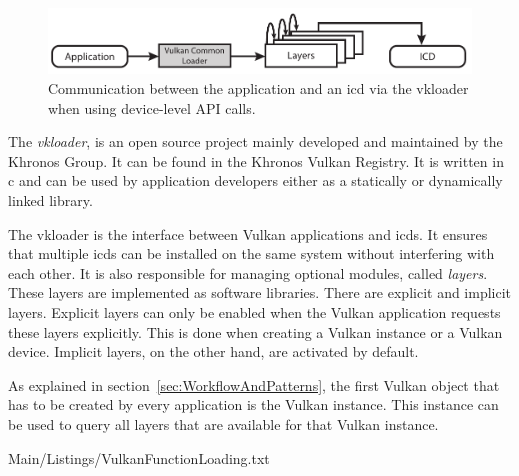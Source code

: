     \begin{figure}
      \includegraphics{Main/Images/VulkanLoaderDeviceLayers}
      \centering
      \caption{Communication between the application and an \gls{icd} via the \gls{vkloader} when using device-level API calls.}
      \label{fig:VulkanLoaderWithDeviceLayers}
    \end{figure}

    The \textit{\gls{vkloader}}, is an open source project mainly developed and maintained by the Khronos Group. It can be found in the Khronos Vulkan Registry\cite{vulkanregistry}. It is written in \gls{c} and can be used by application developers either as a statically or dynamically linked library.

    The \gls{vkloader} is the interface between Vulkan applications and \glspl{icd}. It ensures that multiple \glspl{icd} can be installed on the same system without interfering with each other. It is also responsible for managing optional modules, called \textit{layers}. These layers are implemented as software libraries. There are explicit and implicit layers. Explicit layers can only be enabled when the Vulkan application requests these layers explicitly. This is done when creating a Vulkan instance or a Vulkan device. Implicit layers, on the other hand, are activated by default.

    As explained in section~\ref{sec:WorkflowAndPatterns}, the first Vulkan object that has to be created by every application is the Vulkan instance. This instance can be used to query all layers that are available for that Vulkan instance.

    
    {Main/Listings/VulkanFunctionLoading.txt}

